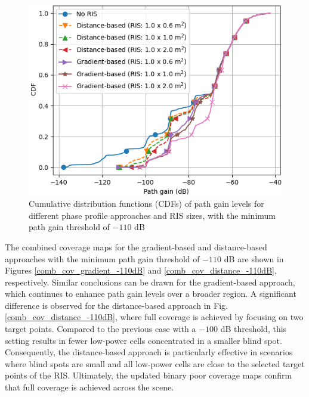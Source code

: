 \documentclass{IEEEoj}
\begin{document}
\begin{figure}
	\centering \includegraphics[width=\linewidth]{Sim_Results/CDF_-110dB.png}
	\caption{Cumulative distribution functions (CDFs) of path gain levels for different phase profile approaches and RIS sizes, with the minimum path gain threshold of $-110$ dB}
	\label{CDF_-110dB}
\end{figure}

The combined coverage maps for the gradient-based and distance-based approaches with the minimum path gain threshold of $-110$ dB are shown in Figures \ref{comb_cov_gradient_-110dB} and \ref{comb_cov_distance_-110dB}, respectively. Similar conclusions can be drawn for the gradient-based approach, which continues to enhance path gain levels over a broader region. A significant difference is observed for the distance-based approach in Fig. \ref{comb_cov_distance_-110dB}, where full coverage is achieved by focusing on two target points. Compared to the previous case with a $-100$ dB threshold, this setting results in fewer low-power cells concentrated in a smaller blind spot. Consequently, the distance-based approach is particularly effective in scenarios where blind spots are small and all low-power cells are close to the selected target points of the RIS. Ultimately, the updated binary poor coverage maps confirm that full coverage is achieved across the scene.
\end{document}
